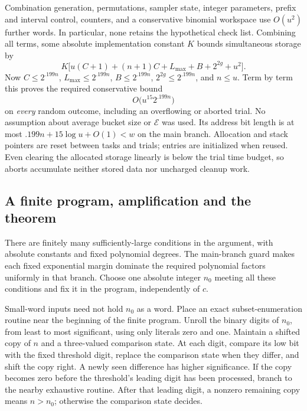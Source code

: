 Combination generation, permutations, sampler state, integer
parameters, prefix and interval control, counters, and a conservative
binomial workspace use \(O(u^2)\) further words. In particular,
none retains the hypothetical check list. Combining all terms, some
absolute implementation constant \(K\) bounds simultaneous storage by
\[
 K\bigl[u(C+1)+(n+1)C+L_{\max}+B+2^{2g}+u^2\bigr].
\]
Now \(C\le2^{.199n}\), \(L_{\max}\le2^{.199n}\),
\(B\le2^{.199n}\), \(2^{2g}\le2^{.199n}\), and \(n\le u\).
Term by term this proves the required conservative bound
\begin{equation}\label{eq:space-final}
 O\bigl(u^{15}2^{.199n}\bigr)
\end{equation}
on \emph{every} random outcome, including an overflowing or aborted
trial. No assumption about average bucket size or \(\mathcal E\) was
used. Its address bit length is at most
\(.199n+15\log u+O(1)<w\) on the main branch.
Allocation and stack pointers are reset between tasks and trials;
entries are initialized when reused. Even clearing the allocated
storage linearly is below the trial time budget, so aborts accumulate
neither stored data nor uncharged cleanup work.

\subsection{A finite program, amplification and the theorem}

There are finitely many sufficiently-large conditions in the argument,
with absolute constants and fixed polynomial degrees. The main-branch
guard makes each fixed exponential margin dominate the required
polynomial factors uniformly in that branch. Choose one absolute
integer \(n_0\) meeting all these conditions and fix it in the program,
independently of \(c\).

Small-word inputs need not hold \(n_0\) as a word. Place an exact
subset-enumeration routine near the beginning of the finite program.
Unroll the binary digits of \(n_0\), from least to most significant,
using only literals zero and one. Maintain a shifted copy of \(n\)
and a three-valued comparison state. At each digit, compare its low
bit with the fixed threshold digit, replace the comparison state
when they differ, and shift the copy right. A newly seen difference
has higher significance. If the copy becomes zero before the
threshold's leading digit has been processed, branch to the nearby
exhaustive routine. After that leading digit, a nonzero remaining copy
means \(n>n_0\); otherwise the comparison state decides.

